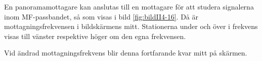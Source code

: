 En panoramamottagare kan anslutas till en mottagare för att studera
signalerna inom MF-passbandet, så som visas i bild \ref{fig:bildII4-16}.
Då är mottagningsfrekvensen i bildskärmens mitt.
Stationerna under och över i frekvens visas till vänster respektive höger
om den egna frekvensen.

Vid ändrad mottagningsfrekvens blir denna fortfarande kvar mitt på skärmen.


